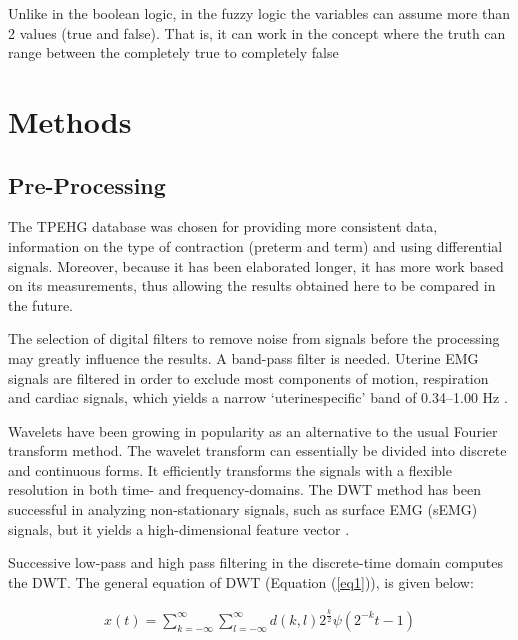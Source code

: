 \documentclass[bioengineering,article,submit,moreauthors,pdftex,10pt,a4paper]{mdpi}
\begin{document}
 Unlike in the boolean logic, in the fuzzy logic the variables can assume more than 2 values (true and false). That is, it can work in the concept where the truth can range between the completely true to completely false \cite{ref-novak}
 
 
 
 \section{Methods}

 \subsection{Pre-Processing}
 
 The TPEHG database was chosen for providing more consistent data, information on the type of contraction (preterm and term) and using differential signals. Moreover, because it has been elaborated longer, it has more work based on its measurements, thus allowing the results obtained here to be compared in the future.
 
 The selection of digital filters to remove noise from signals
 before the processing may greatly influence the results.
 A band-pass filter is needed.  Uterine EMG signals are filtered in order to exclude
 most components of motion, respiration and cardiac signals, which yields a narrow ‘uterinespecific’ band of 0.34–1.00 Hz \cite{ref-lucovnik}.
 
 Wavelets have been growing in popularity as an alternative to the usual Fourier transform method.
 The wavelet transform can essentially be divided into discrete and continuous forms. It efficiently transforms the signals with a flexible resolution in both time- and frequency-domains. The DWT method has been successful in analyzing non-stationary signals,
 such as surface EMG (sEMG) signals, but it yields a high-dimensional feature vector \cite{ref-chu}.
 
 Successive low-pass and high pass filtering in the discrete-time domain computes the DWT. The
 general equation of DWT (Equation (\ref{eq1})), is given below:
 
 
 \begin{equation}
 	\begin{array}{ccc}
 		
 		x(t) = \sum_{k=-\infty}^{\infty }\sum_{l=-\infty}^{\infty }d(k,l)2^{\frac{k}{2}}\psi(2^{-k}t-1)
 		
 		
 	\end{array}
 	\label{eq1}
 \end{equation}
 
\end{document}
